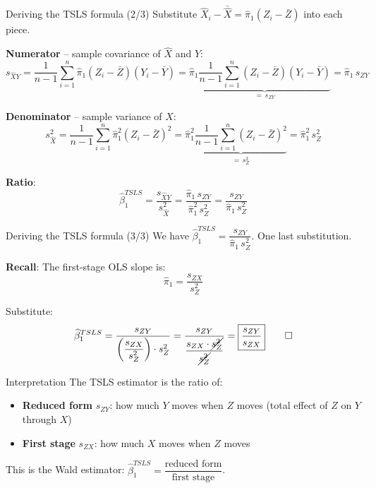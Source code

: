 \documentclass[10pt]{beamer}
\begin{document}
\begin{frame}{Deriving the TSLS formula (2/3)}
Substitute $\widehat{X}_i - \bar{\widehat{X}} = \widehat{\pi}_1(Z_i - \bar{Z})$ into each piece.

\pause
\vspace{0.5em}
\textbf{Numerator} -- sample covariance of $\widehat{X}$ and $Y$:
\[
s_{\widehat{X}Y} = \frac{1}{n-1}\sum_{i=1}^n \widehat{\pi}_1(Z_i - \bar{Z})(Y_i - \bar{Y}) = \widehat{\pi}_1 \underbrace{\frac{1}{n-1}\sum_{i=1}^n (Z_i - \bar{Z})(Y_i - \bar{Y})}_{=\,s_{ZY}} = \widehat{\pi}_1 \, s_{ZY}
\]

\pause
\vspace{0.3em}
\textbf{Denominator} -- sample variance of $\widehat{X}$:
\[
s_{\widehat{X}}^2 = \frac{1}{n-1}\sum_{i=1}^n \widehat{\pi}_1^2(Z_i - \bar{Z})^2 = \widehat{\pi}_1^2 \underbrace{\frac{1}{n-1}\sum_{i=1}^n (Z_i - \bar{Z})^2}_{=\,s_Z^2} = \widehat{\pi}_1^2 \, s_Z^2
\]

\pause
\vspace{0.3em}
\textbf{Ratio}:
\[
\widehat{\beta}_1^{TSLS} = \frac{s_{\widehat{X}Y}}{s_{\widehat{X}}^2} = \frac{\widehat{\pi}_1 \, s_{ZY}}{\widehat{\pi}_1^2 \, s_Z^2} = \frac{s_{ZY}}{\widehat{\pi}_1 \, s_Z^2}
\]
\end{frame}

\begin{frame}{Deriving the TSLS formula (3/3)}
We have $\widehat{\beta}_1^{TSLS} = \dfrac{s_{ZY}}{\widehat{\pi}_1 \, s_Z^2}$. One last substitution.

\pause
\vspace{0.5em}
\textbf{Recall}: The first-stage OLS slope is:
\[
\widehat{\pi}_1 = \frac{s_{ZX}}{s_Z^2}
\]

\pause
Substitute:
\[
\widehat{\beta}_1^{TSLS} = \frac{s_{ZY}}{\left(\dfrac{s_{ZX}}{s_Z^2}\right) \cdot s_Z^2} = \frac{s_{ZY}}{\dfrac{s_{ZX} \cdot \cancel{s_Z^2}}{\cancel{s_Z^2}}} = \boxed{\frac{s_{ZY}}{s_{ZX}}} \qed
\]

\pause
\vspace{0.3em}
\begin{block}{Interpretation}
The TSLS estimator is the ratio of:
\begin{itemize}
  \item \textbf{Reduced form} $s_{ZY}$: how much $Y$ moves when $Z$ moves (total effect of $Z$ on $Y$ through $X$)
  \item \textbf{First stage} $s_{ZX}$: how much $X$ moves when $Z$ moves
\end{itemize}
This is the \alert{Wald estimator}: $\widehat{\beta}_1^{TSLS} = \dfrac{\text{reduced form}}{\text{first stage}}$.
\end{block}
\end{frame}
\end{document}
